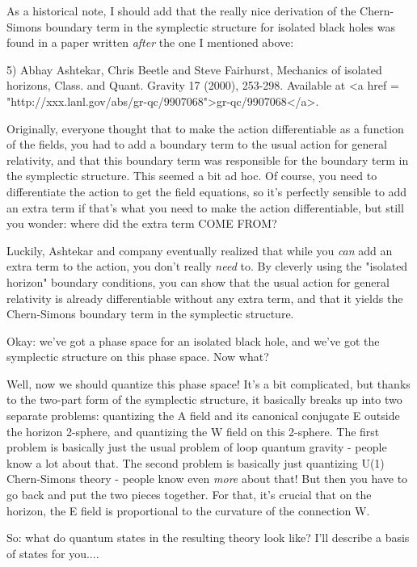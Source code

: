 As a historical note, I should add that the really nice derivation of 
the Chern-Simons boundary term in the symplectic structure for isolated
black holes was found in a paper written \emph{after} the one I mentioned 
above:

5) Abhay Ashtekar, Chris Beetle and Steve Fairhurst, Mechanics of
isolated horizons, Class. and Quant. Gravity 17 (2000), 253-298.
Available at 
<a href = "http://xxx.lanl.gov/abs/gr-qc/9907068">gr-qc/9907068</a>.

Originally, everyone thought that to make the action differentiable as a
function of the fields, you had to add a boundary term to the usual
action for general relativity, and that this boundary term was
responsible for the boundary term in the symplectic structure.  This
seemed a bit ad hoc.  Of course, you need to differentiate the action to
get the field equations, so it's perfectly sensible to add an extra term
if that's what you need to make the action differentiable, but still you
wonder: where did the extra term COME FROM?

Luckily, Ashtekar and company eventually realized that while you \emph{can}
add an extra term to the action, you don't really \emph{need} to.  By
cleverly using the "isolated horizon" boundary conditions, you
can show that the usual action for general relativity is already
differentiable without any extra term, and that it yields the
Chern-Simons boundary term in the symplectic structure.

Okay: we've got a phase space for an isolated black hole, and we've
got the symplectic structure on this phase space.  Now what?

Well, now we should quantize this phase space!  It's a bit complicated,
but thanks to the two-part form of the symplectic structure, it
basically breaks up into two separate problems: quantizing the A field
and its canonical conjugate E outside the horizon 2-sphere, and
quantizing the W field on this 2-sphere.  The first problem is basically
just the usual problem of loop quantum gravity - people know a lot about
that.  The second problem is basically just quantizing U(1) Chern-Simons
theory - people know even \emph{more} about that!  But then you have to go
back and put the two pieces together.  For that, it's crucial that on
the horizon, the E field is proportional to the curvature of the 
connection W.    

So: what do quantum states in the resulting theory look like?  I'll
describe a basis of states for you....


